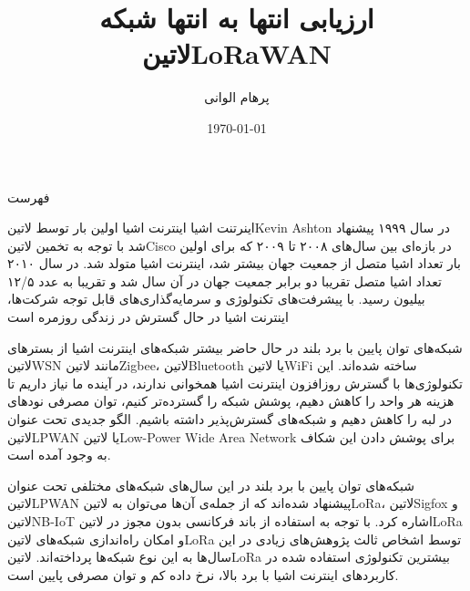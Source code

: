 \documentclass[dvipsnames]{beamer}
\title{ارزیابی انتها به انتها شبکه \متن‌لاتین{LoRaWAN}}
\subtitle{}
\author{پرهام الوانی}
\institute{%
	دانشکده مهندسی کامپیوتر\\
	دکتر بهادر بخشی و دکتر مهدی راستی
}
\date{\today}
\begin{document}
\begin{persian}

	{%
		\begin{frame}
		  \titlepage%
		\end{frame}
	}

	\begin{frame}{فهرست}
	  \RaggedLeft
	  \tableofcontents[pausesections]
	\end{frame}

	\قسمت{مقدمه}

	\begin{frame}{اینرتنت اشیا}
		\شروع{فقرات}
		 اینترنت اشیا اولین بار توسط ‌لاتین{Kevin Ashton} در سال ۱۹۹۹ پیشنهاد شد
		 با توجه به تخمین ‌لاتین{Cisco} در بازه‌ای بین سال‌های ۲۰۰۸ تا ۲۰۰۹ که برای اولین بار تعداد اشیا
		متصل از جمعیت جهان بیشتر شد، اینترنت اشیا متولد شد.
		 در سال ۲۰۱۰ تعداد اشیا متصل تقریبا دو برابر جمعیت جهان در آن سال شد و تقریبا به عدد ۱۲/۵ بیلیون رسید.
		 با پیشرفت‌های تکنولوژی و سرمایه‌گذاری‌های قابل توجه شرکت‌ها، اینترنت اشیا در حال گسترش در زندگی روزمره است
		\پایان{فقرات}
	\end{frame}

	\begin{frame}{شبکه‌های توان پایین با برد بلند}
		 در حال حاضر بیشتر شبکه‌های اینترنت اشیا از بسترهای ‌لاتین{WSN} مانند ‌لاتین{Zigbee}، ‌لاتین{Bluetooth} یا ‌لاتین{WiFi} ساخته شده‌اند.
		 این تکنولوژی‌ها با گسترش روزافزون اینترنت اشیا همخوانی ندارند، در آینده ما نیاز داریم تا هزینه هر واحد را کاهش دهیم، پوشش شبکه را گسترده‌تر کنیم، توان مصرفی نودهای در لبه را کاهش دهیم و شبکه‌های گسترش‌پذیر داشته باشیم.
		 الگو جدیدی تحت عنوان ‌لاتین{LPWAN} یا ‌لاتین{Low-Power Wide Area Network} برای پوشش دادن این شکاف به وجود آمده است.
	\end{frame}

	\begin{frame}{شبکه‌های توان پایین با برد بلند}
		 در این سال‌های شبکه‌های مختلفی تحت عنوان ‌لاتین{LPWAN} پیشنهاد شده‌اند که از جمله‌ی آن‌ها می‌توان به ‌لاتین{LoRa}، ‌لاتین{Sigfox} و ‌لاتین{NB-IoT} اشاره کرد.
		 با توجه به استفاده از باند فرکانسی بدون مجوز در ‌لاتین{LoRa} و امکان راه‌اندازی شبکه‌های ‌لاتین{LoRa} توسط اشخاص ثالث پژوهش‌های زیادی در این سال‌ها به این نوع شبکه‌ها پرداخته‌اند.
		 ‌لاتین{LoRa} بیشترین تکنولوژی استفاده شده در کاربردهای اینترنت اشیا با برد بالا، نرخ داده کم و توان مصرفی پایین است.
	\end{frame}


\end{persian}
\end{document}
